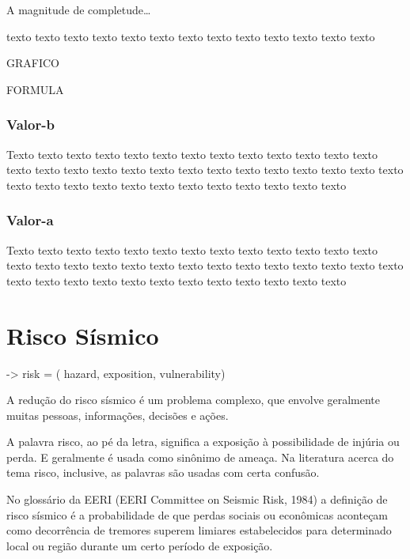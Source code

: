 A magnitude de completude\ldots 

texto texto texto texto texto texto texto texto texto texto texto texto texto


GRAFICO

FORMULA



\subsubsection{Valor-b}
\label{sec:risco_sismico}


Texto texto texto texto texto texto texto texto texto texto texto texto texto
texto texto texto texto texto texto texto texto texto texto texto texto texto
texto texto texto texto texto texto texto texto texto texto texto texto texto


\subsubsection{Valor-a}
\label{sec:risco_sismico}



Texto texto texto texto texto texto texto texto texto texto texto texto texto
texto texto texto texto texto texto texto texto texto texto texto texto texto
texto texto texto texto texto texto texto texto texto texto texto texto texto




\section{Risco Sísmico}
\label{sec:risco_sismico}

-> risk = ( hazard, 
			exposition, 
			vulnerability)


A redução do risco sísmico é um problema complexo, que envolve geralmente muitas pessoas, informações, decisões e ações.

A palavra risco, ao pé da letra, significa a exposição à possibilidade de injúria ou perda. E geralmente é usada como
sinônimo de ameaça. Na literatura acerca do tema risco, inclusive, as palavras são usadas com certa confusão.

No glossário da EERI (EERI Committee on Seismic Risk, 1984) a definição de risco sísmico é a probabilidade de que
perdas sociais ou econômicas aconteçam como decorrência de tremores superem limiares estabelecidos para determinado
local ou região durante um certo período de exposição.

